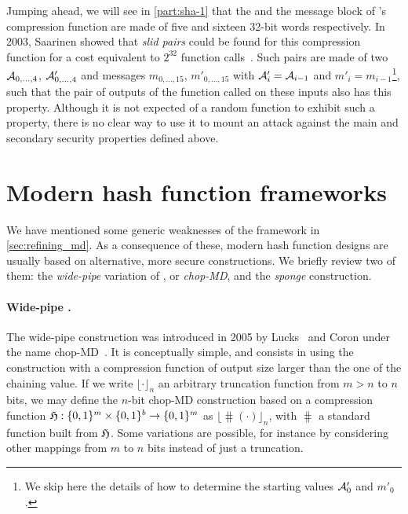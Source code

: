 Jumping ahead, we will see in \autoref{part:sha-1} that the \iv and the message block of \shaone's compression function are made of five and sixteen
32-bit words respectively. In 2003, Saarinen showed that \emph{slid pairs} could be found for this compression function for a cost equivalent to $2^{32}$
function calls~\cite{DBLP:conf/fse/Saarinen03}. Such pairs are made of two \ivs $\mathcal{A}_{0,\ldots,4}$, $\mathcal{A}'_{0,\ldots,4}$ and messages $m_{0,\ldots,15}$,
$m'_{0,\ldots,15}$ with $\mathcal{A}'_i = \mathcal{A}_{i-1}$ and $m'_i = m_{i-1}$\footnote{We skip here the details of how to determine the starting values $\mathcal{A}'_0$ and $m'_0$.}, such that the
pair of outputs of the function called on these inputs also has this property. Although it is not expected of a random function to exhibit such a property, there is no clear way to use it to mount
an attack against the main and secondary security properties defined above.


\section{Modern hash function frameworks}
\label{sec:betterhash}

We have mentioned some generic weaknesses of the \merkdam framework in \autoref{sec:refining_md}. As a consequence of these, modern hash function designs are usually based on alternative,
more secure constructions. We briefly review two of them: the \emph{wide-pipe} variation of \merkdam, or \emph{chop-MD}, and the \emph{sponge} construction.

\paragraph{Wide-pipe \merkdam.} The wide-pipe construction was introduced in 2005 by Lucks~\cite{DBLP:conf/asiacrypt/Lucks05} and Coron \etal under the name chop-MD~\cite{DBLP:conf/crypto/CoronDMP05}.
It is conceptually simple, and consists in using the \merkdam construction with a compression function of output size larger than the one of the chaining value. If we write $\lfloor\cdot\rfloor_n$
an arbitrary truncation function from $m > n$ to $n$ bits, we may define the $n$-bit chop-MD construction based on a compression function $\operatorname{\mathfrak{H}} : \{0,1\}^m \times \{0,1\}^b \rightarrow \{0,1\}^m$
as $\lfloor\hash(\cdot)\rfloor_n$, with $\hash$ a standard \merkdam function built from $\operatorname{\mathfrak{H}}$. Some variations are possible, for instance by considering other mappings from $m$ to $n$
bits instead of just a truncation.

